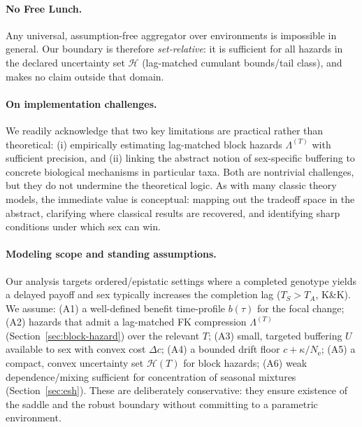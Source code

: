 \documentclass[11pt]{article}
\theoremstyle{upright}
\newcommand{\Ne}{N_{\mathrm{e}}}
\newcommand{\Hset}{\mathcal{H}}
\newcommand{\hazT}[1]{\Lambda^{(#1)}}          %
\begin{document}
\paragraph{No Free Lunch.}
Any universal, assumption-free aggregator over environments is impossible in general. Our boundary is therefore \emph{set-relative}: it is sufficient for all
hazards in the declared uncertainty set $\Hset$ (lag-matched cumulant bounds/tail class), and makes no claim outside that domain.

\paragraph{On implementation challenges.}
We readily acknowledge that two key limitations are practical rather than theoretical: (i) empirically estimating lag-matched block hazards $\hazT{T}$ with sufficient precision, and (ii) linking the abstract notion of sex-specific buffering to concrete biological mechanisms in particular taxa. Both are nontrivial challenges, but they do not undermine the theoretical logic. As with many classic theory models, the immediate value is conceptual: mapping out the tradeoff space in the abstract, clarifying where classical results are recovered, and identifying sharp conditions under which sex can win.

\paragraph{Modeling scope and standing assumptions.}
Our analysis targets ordered/epistatic settings where a completed genotype yields a delayed payoff and sex typically increases the completion lag ($T_S>T_A$, K\&K). We assume: (A1) a well-defined benefit time-profile $b(\tau)$ for the focal change; (A2) hazards that admit a lag-matched FK compression $\hazT{T}$ (Section~\ref{sec:block-hazard}) over the relevant $T$; (A3) small, targeted buffering $U$ available to sex with convex cost $\Delta c$; (A4) a bounded drift floor $c+\kappa/\Ne$; (A5) a compact, convex uncertainty set $\mathcal H(T)$ for block hazards; (A6) weak dependence/mixing sufficient for concentration of seasonal mixtures (Section~\ref{sec:esh}). These are deliberately conservative: they ensure existence of the saddle and the robust boundary without committing to a parametric environment.
\end{document}

